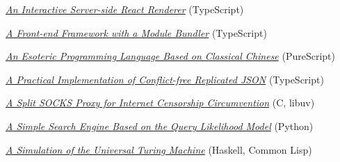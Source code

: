 \documentclass[11pt]{article}
\begin{document}
\href{https://github.com/galmungral/react-teletype}{\textit{An Interactive Server-side React Renderer}} \hfill (TypeScript)

\href{https://github.com/galmungral/replay}{\textit{A Front-end Framework with a Module Bundler}} \hfill (TypeScript)

\href{https://galmungral.github.io/hanbun-lang}{\textit{An Esoteric Programming Language Based on Classical Chinese}} \hfill (PureScript)

\href{https://github.com/galmungral/json-crdt}{\textit{A Practical Implementation of Conflict-free Replicated JSON}} \hfill (TypeScript)

\href{https://github.com/galmungral/telescope}{\textit{A Split SOCKS Proxy for Internet Censorship Circumvention}} \hfill (C, libuv)

\href{https://github.com/galmungral/plato}{\textit{A Simple Search Engine Based on the Query Likelihood Model}} \hfill (Python)

\href{https://github.com/galmungral/turing-machine}{\textit{A Simulation of the Universal Turing Machine}} \hfill (Haskell, Common Lisp)
\end{document}
